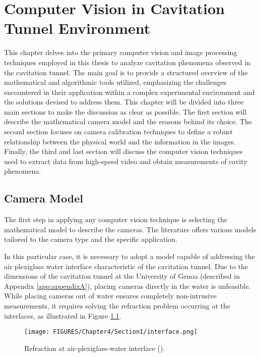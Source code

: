 \chapter{Computer Vision in Cavitation Tunnel Environment}
\label{chap:chapter4}

This chapter delves into the primary computer vision and image processing techniques employed in this thesis to analyze cavitation phenomena observed in the cavitation tunnel. The main goal is to provide a structured overview of the mathematical and algorithmic tools utilized, emphasizing the challenges encountered in their application within a complex experimental environment and the solutions devised to address them.
This chapter will be divided into three main sections to make the discussion as clear as possible. The first section will describe the mathematical camera model and the reasons behind its choice. The second section focuses on camera calibration techniques to define a robust relationship between the physical world and the information in the images. Finally, the third and last section will discuss the computer vision techniques used to extract data from high-speed video and obtain measurements of cavity phenomena.

\section{Camera Model}

The first step in applying any computer vision technique is selecting the mathematical model to describe the cameras.
The literature offers various models tailored to the camera type and the specific application.

In this particular case, it is necessary to adopt a model capable of addressing the air plexiglass water interface characteristic of the cavitation tunnel. Due to the dimensions of the cavitation tunnel at the University of Genoa (described in Appendix \ref{app:appendixA}), placing cameras directly in the water is unfeasible. While placing cameras out of water ensures completely non-intrusive measurements, it requires solving the refraction problem occurring at the interfaces, as illustrated in Figure \ref{fig:interface}.

\begin{figure}[htbp]
    \centering
    \texttt{[image: FIGURES/Chapter4/Section1/interface.png]} 
    \caption{Refraction at air-plexiglass-water interface (\cite{Sedlazeck2012}).} 
    \label{fig:interface}  
\end{figure}


